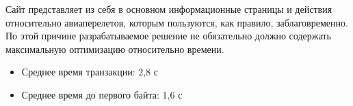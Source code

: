 % 
% 
% 
% 
% 


Сайт представляет из себя в основном информационные страницы и действия относительно
авиаперелетов, которым пользуются, как правило, заблаговременно. По этой причине разрабатываемое решение
не обязательно должно содержать максимальную оптимизацию относительно времени.

\begin{itemize}
    \item Среднее время транзакции: 2,8 с %
    \item Среднее время до первого байта: 1,6 с
\end{itemize}

